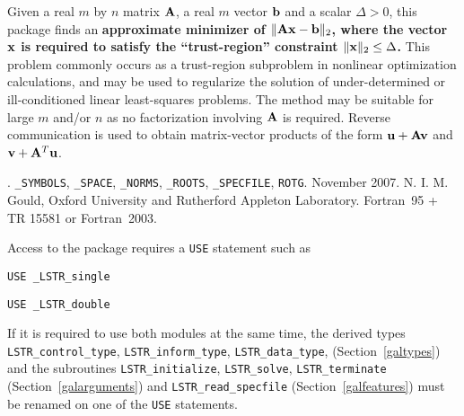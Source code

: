 \documentclass{galahad}
\newcommand{\packagename}{LS\-TR}
\newcommand{\fullpackagename}{\libraryname\_\packagename}
\begin{document}
\galheader


\galsummary
Given a real $m$ by $n$ matrix ${\mathbf{A}}$, a real  
$m$ vector ${\mathbf{b}}$ and a scalar $\Delta>0$, this package finds an  
{\bf approximate minimizer of $\| {\mathbf{A}} {\mathbf{x}} - {\mathbf{b}}\|_2$, where the vector 
${\mathbf{x}}$ is required to satisfy the ``trust-region'' 
constraint $\|{\mathbf{x}}\|_2 \leq  \Delta$.}
This problem commonly occurs as a trust-region subproblem in nonlinear 
optimization calculations, and may be used to regularize the solution 
of under-determined or ill-conditioned linear least-squares problems.
The method may be suitable for large $m$ and/or $n$ as no factorization 
involving ${\mathbf{A}}$ is required. Reverse communication is used to obtain  
matrix-vector products of the form ${\mathbf{u}} + {\mathbf{A}} {\mathbf{v}}$ and
${\mathbf{v}} + {\mathbf{A}}^T {\mathbf{u}}$.


\galattributes
\galversions{\tt  \fullpackagename\_single, \fullpackagename\_double}.
\galuses 
{\tt \libraryname\_SY\-M\-BOLS}, 
{\tt \libraryname\_SPACE}, {\tt \libraryname\_\-NORMS}, 
{\tt \libraryname\_ROOTS}, {\tt \libraryname\_SPECFILE},
{\tt *ROTG}.
\galdate November 2007.
\galorigin N. I. M. Gould, Oxford University and Rutherford Appleton Laboratory.
\gallanguage Fortran~95 + TR 15581 or Fortran~2003. 


\galhowto

Access to the package requires a {\tt USE} statement such as

\medskip{}

\hskip0.5in {\tt USE \fullpackagename\_single}

\medskip{}

\hskip0.5in {\tt USE  \fullpackagename\_double}

\medskip

\noindent
If it is required to use both modules at the same time, the derived types 
{\tt \packagename\_control\_type}, {\tt \packagename\_inform\_type}, 
{\tt \packagename\_data\_type},
(Section~\ref{galtypes})
and the subroutines
{\tt \packagename\_initialize},  
{\tt \packagename\_solve}, {\tt \packagename\_terminate}
(Section~\ref{galarguments})
and 
{\tt \packagename\_read\_specfile}
(Section~\ref{galfeatures})
must be renamed on one of the {\tt USE} statements.
\end{document}
